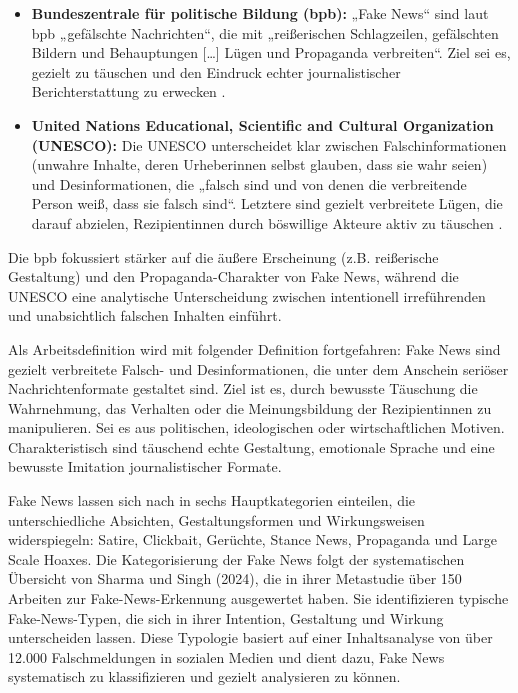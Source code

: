 \begin{itemize}
    \item \textbf{Bundeszentrale für politische Bildung (bpb):}
    „Fake News“ sind laut bpb „gefälschte Nachrichten“, die mit „reißerischen Schlagzeilen, gefälschten Bildern und Behauptungen […] Lügen und Propaganda verbreiten“. 
    Ziel sei es, gezielt zu täuschen und den Eindruck echter journalistischer Berichterstattung zu erwecken \cite{bpb2022fakenews}.

    \item \textbf{United Nations Educational, Scientific and Cultural Organization (UNESCO):}
    Die UNESCO unterscheidet klar zwischen Falschinformationen (unwahre Inhalte, deren Urheberinnen selbst glauben, dass sie wahr seien) und Desinformationen, 
    die „falsch sind und von denen die verbreitende Person weiß, dass sie falsch sind“. Letztere sind gezielt verbreitete Lügen, die darauf abzielen, 
    Rezipientinnen durch böswillige Akteure aktiv zu täuschen \cite{unesco2022fakenews}.
\end{itemize}

Die bpb fokussiert stärker auf die äußere Erscheinung (z.B. reißerische Gestaltung) und den Propaganda-Charakter von Fake News, 
während die UNESCO eine analytische Unterscheidung zwischen intentionell irreführenden und unabsichtlich falschen Inhalten einführt.

Als Arbeitsdefinition wird mit folgender Definition fortgefahren:
Fake News sind gezielt verbreitete Falsch- und Desinformationen, die unter dem Anschein seriöser Nachrichtenformate gestaltet sind. 
Ziel ist es, durch bewusste Täuschung die Wahrnehmung, das Verhalten oder die Meinungsbildung der Rezipientinnen zu manipulieren. Sei es aus politischen, 
ideologischen oder wirtschaftlichen Motiven. Charakteristisch sind täuschend echte Gestaltung, emotionale Sprache und eine bewusste Imitation journalistischer Formate.

Fake News lassen sich nach \cite{Sharma:2024} in sechs Hauptkategorien einteilen, die unterschiedliche Absichten, Gestaltungsformen und Wirkungsweisen widerspiegeln: 
Satire, Clickbait, Gerüchte, Stance News, Propaganda und Large Scale Hoaxes.
Die Kategorisierung der Fake News folgt der systematischen Übersicht von Sharma und Singh (2024), 
die in ihrer Metastudie über 150 Arbeiten zur Fake-News-Erkennung ausgewertet haben. 
Sie identifizieren typische Fake-News-Typen, die sich in ihrer Intention, Gestaltung und Wirkung unterscheiden lassen. 
Diese Typologie basiert auf einer Inhaltsanalyse von über 12.000 Falschmeldungen in sozialen Medien und dient dazu, 
Fake News systematisch zu klassifizieren und gezielt analysieren zu können.

